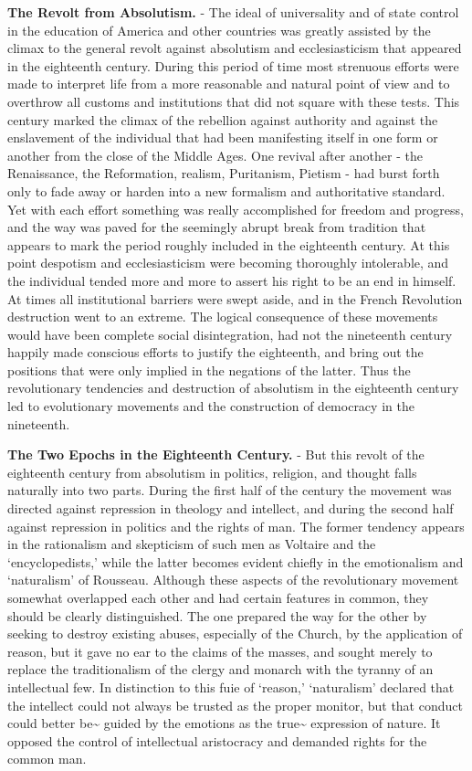 \documentclass[]{book}
\begin{document}
\textbf{The Revolt from Absolutism.} - The ideal of universality and of state control in the education of America and other countries was greatly assisted by the climax to the general revolt against absolutism and ecclesiasticism that appeared in the eighteenth century. During this period of time most strenuous efforts were made to interpret life from a more reasonable and natural point of view and to overthrow all customs and institutions that did not square with these tests. This century marked the climax of the rebellion against authority and against the enslavement of the individual that had been manifesting itself in one form or another from the close of the Middle Ages. One revival after another - the Renaissance, the Reformation, realism, Puritanism, Pietism - had burst forth only to fade away or harden into a new formalism and authoritative standard. Yet with each effort something was really accomplished for freedom and progress, and the way was paved for the seemingly abrupt break from tradition that appears to mark the period roughly included in the eighteenth century. At this point despotism and ecclesiasticism were becoming thoroughly intolerable, and the individual tended more and more to assert his right to be an end in himself. At times all institutional barriers were swept aside, and in the French Revolution destruction went to an extreme. The logical consequence of these movements would have been complete social disintegration, had not the nineteenth century happily made conscious efforts to justify the eighteenth, and bring out the positions that were only implied in the negations of the latter. Thus the revolutionary tendencies and destruction of absolutism in the eighteenth century led to evolutionary movements and the construction of democracy in the nineteenth.

\textbf{The Two Epochs in the Eighteenth Century.} - But this revolt of the eighteenth century from absolutism in politics, religion, and thought falls naturally into two parts. During the first half of the century the movement was directed against repression in theology and intellect, and during the second half against repression in politics and the rights of man. The former tendency appears in the rationalism and skepticism of such men as Voltaire and the `encyclopedists,' while the latter becomes evident chiefly in the emotionalism and `naturalism' of Rousseau. Although these aspects of the revolutionary movement somewhat overlapped each other and had certain features in common, they should be clearly distinguished. The one prepared the way for the other by seeking to destroy existing abuses, especially of the Church, by the application of reason, but it gave no ear to the claims of the masses, and sought merely to replace the traditionalism of the clergy and monarch with the tyranny of an intellectual few. In distinction to this fuie of `reason,' `naturalism' declared that the intellect could not always be trusted as the proper monitor, but that conduct could better be\textasciitilde{} guided by the emotions as the true\textasciitilde{} expression of nature. It opposed the control of intellectual aristocracy and demanded rights for the common man.
\end{document}
